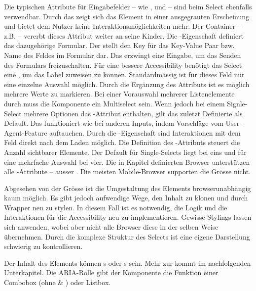 Die typischen Attribute für Eingabefelder – wie ,  und  – sind beim Select ebenfalls verwendbar. 
Durch das  zeigt sich das Element in einer ausgegrauten Erscheinung und bietet dem Nutzer keine Interaktionsmöglichkeiten mehr. 
Der Container – z.B.  – vererbt dieses Attribut weiter an seine Kinder. 
Die -Eigenschaft definiert das dazugehörige Formular. 
Der  stellt den Key für das Key-Value Paar bzw. Name des Feldes im Formular dar. 
Das  erzwingt eine Eingabe, um das Senden des Formulars freizuschalten. 
Für eine bessere Accessibility benötigt das Select eine , um das Label zuweisen zu können. 
Standardmässig ist für dieses Feld nur eine einzelne Auswahl möglich. 
Durch die Ergänzung des Attributs  ist es möglich mehrere Werte zu markieren. 
Bei einer Vorauswahl mehrerer Listenelemente durch  muss die Komponente ein Multiselect sein. 
Wenn jedoch bei einem Signle-Select mehrere Optionen das -Attribut enthalten, gilt das zuletzt Definierte als Default. 
Das  funktioniert wie bei anderen Inputs, indem Vorschläge vom User-Agent-Feature auftauchen. 
Durch die -Eigenschaft sind Interaktionen mit dem Feld direkt nach dem Laden möglich. 
Die Definition des -Attributs steuert die Anzahl sichtbarer Elemente. 
Der Default für Single-Selects liegt bei eins und für eine mehrfache Auswahl bei vier. 
Die in Kapitel \textbf{} definierten Browser unterstützen alle -Attribute – ausser .
Die meisten Mobile-Browser supporten die Grösse nicht. 

Abgesehen von der Grösse ist die Umgestaltung des Elements browserunabhängig kaum möglich. 
Es gibt jedoch aufwendige Wege, den Inhalt zu klonen und durch Wrapper neu zu stylen. 
In diesem Fall ist es notwendig, die Logik und die Interaktionen für die Accessibility neu zu implementieren. 
Gewisse Stylings lassen sich anwenden, wobei aber nicht alle Browser diese in der selben Weise übernehmen. 
Durch die komplexe Struktur des Selects ist eine eigene Darstellung schwierig zu kontrollieren. 

Der Inhalt des Elements können s oder s sein. 
Mehr zur  kommt im nachfolgenden Unterkapitel. 
Die ARIA-Rolle gibt der Komponente die Funktion einer Combobox (ohne  \& ) oder Listbox. 

